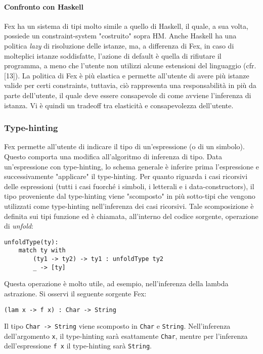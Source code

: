 \documentclass[10pt,a4paper]{article}
\begin{document}
\paragraph{Confronto con Haskell}
Fex ha un sistema di tipi molto simile a quello di Haskell, il quale, a sua volta, possiede un constraint-system
"costruito" sopra HM. Anche Haskell ha una politica \textit{lazy} di risoluzione delle istanze, ma, a differenza di Fex,
in caso di molteplici istanze soddisfatte, l'azione di default è quella di rifiutare il programma, a meno che l'utente
non utilizzi alcune estensioni del linguaggio (cfr. [13]). La politica di Fex è più elastica e permette all'utente
di avere più istanze valide per certi constraints, tuttavia, ciò rappresenta una responsabilità in più da parte
dell'utente, il quale deve essere consapevole di come avviene l'inferenza di istanza. Vi è quindi un tradeoff tra
elasticità e consapevolezza dell'utente.

\subsubsection{Type-hinting}
Fex permette all'utente di indicare il tipo di un'espressione (o di un simbolo). Questo comporta una modifica
all'algoritmo di inferenza di tipo. Data un'espressione con type-hinting, lo schema generale è inferire prima
l'espressione e successivamente "applicare" il type-hinting. Per quanto riguarda i casi ricorsivi delle espressioni
(tutti i casi fuorché i simboli, i letterali e i data-constructors), il tipo proveniente dal type-hinting viene
"scomposto" in più sotto-tipi che vengono utilizzati come type-hinting nell'inferenza dei casi ricorsivi. Tale
scomposizione è definita sui tipi funzione ed è chiamata, all'interno del codice sorgente, operazione di
\textit{unfold}:
\begin{lstlisting}
unfoldType(ty):
    match ty with
        (ty1 -> ty2) -> ty1 : unfoldType ty2
        _ -> [ty]
\end{lstlisting}
Questa operazione è molto utile, ad esempio, nell'inferenza della lambda astrazione. Si osservi il seguente sorgente
Fex:
\begin{lstlisting}
(lam x -> f x) : Char -> String
\end{lstlisting}
Il tipo \texttt{Char -> String} viene scomposto in \texttt{Char} e \texttt{String}. Nell'inferenza dell'argomento
\texttt{x}, il type-hinting sarà esattamente \texttt{Char}, mentre per l'inferenza dell'espressione \texttt{f x}
il type-hinting sarà \texttt{String}.
\end{document}
